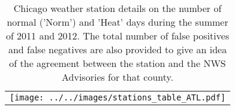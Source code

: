 \documentclass{ametsoc}
\begin{document}
%
%
%




%



\begin{table}
\caption{Chicago weather station details on the number of normal ('Norm') and 'Heat' days during the summer of 2011 and 2012.  The total number of false positives and false negatives are also provided to give an idea of the agreement between the station and the NWS Advisories for that county.}
\begin{center}
\begin{tabular}{c}
\texttt{[image: ../../images/stations\_table\_ATL.pdf]} 
\end{tabular}
\label{tab:ATLstats}
\end{center}
\end{table}
\end{document}
